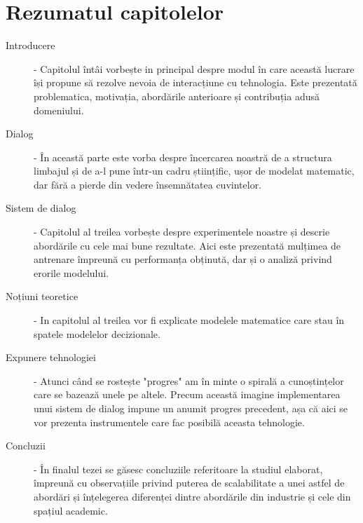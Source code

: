\section{Rezumatul capitolelor}
\begin{description}
	\item[Introducere]  - 
		Capitolul întâi vorbește in principal despre modul în care această lucrare își propune să rezolve nevoia de interacțiune cu tehnologia. Este prezentată problematica, motivația, abordările anterioare și contribuția adusă domeniului.
	\item[Dialog] -
		În această parte este vorba despre încercarea noastră de a structura limbajul și de a-l pune într-un cadru științific, ușor de modelat matematic, dar fără a pierde din vedere însemnătatea cuvintelor.
	\item[Sistem de dialog] - 
		Capitolul al treilea vorbește despre experimentele noastre și descrie abordările cu cele mai bune rezultate. Aici este prezentată mulțimea de antrenare împreună cu performanța obținută, dar și o analiză privind erorile modelului.
		
	\item[Noțiuni teoretice] -
		In capitolul al treilea vor fi explicate modelele matematice care stau în spatele modelelor decizionale.
	\item[Expunere tehnologiei] - 
		Atunci când se rostește "progres" am în minte o  spirală a cunoștințelor care se bazează unele pe altele. Precum această imagine implementarea unui sistem de dialog impune un anumit progres precedent, așa că aici se vor prezenta instrumentele care fac posibilă aceasta tehnologie.
	\item[Concluzii] -
		În finalul tezei se găsesc concluziile referitoare la studiul elaborat, împreună cu observațiile privind puterea de scalabilitate a unei astfel de abordări și înțelegerea diferenței dintre abordările din industrie și cele din spațiul academic.
\end{description}

